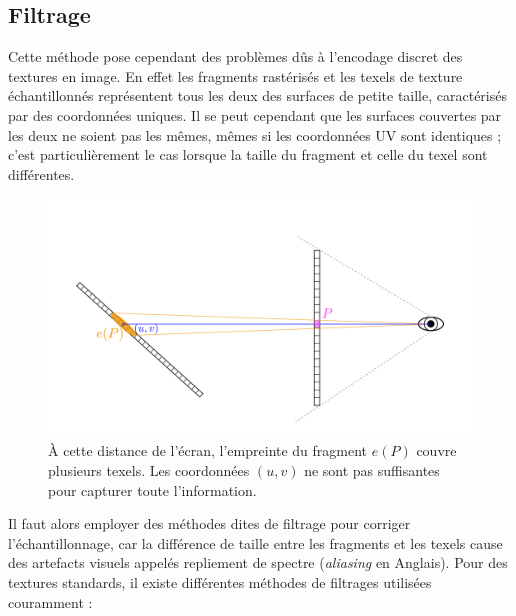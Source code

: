 \subsection*{Filtrage}

Cette méthode pose cependant des problèmes dûs à l'encodage discret des textures en image. En effet les fragments rastérisés et les texels de texture échantillonnés représentent tous les deux des surfaces de petite taille, caractérisés par des coordonnées uniques. Il se peut cependant que les surfaces couvertes par les deux ne soient pas les mêmes, mêmes si les coordonnées UV sont identiques ; c'est particulièrement le cas lorsque la taille du fragment et celle du texel sont différentes. 

\bigskip

\begin{figure}
    \centering
    \includegraphics[width=\textwidth]{contenu/resources/images/schema_filtrage}
    \caption[Visualisation du problème d'échantillonnage lors du rendu par rastérisation]{À cette distance de l'écran, l'empreinte du fragment $e(P)$ couvre plusieurs texels. Les coordonnées $(u, v)$ ne sont pas suffisantes pour capturer toute l'information.}
    \label{fig:aliasing}
\end{figure}

Il faut alors employer des méthodes dites de filtrage pour corriger l'échantillonnage, car la différence de taille entre les fragments et les texels cause des artefacts visuels appelés repliement de spectre (\textit{aliasing} en Anglais). Pour des textures standards, il existe différentes méthodes de filtrages utilisées couramment :

